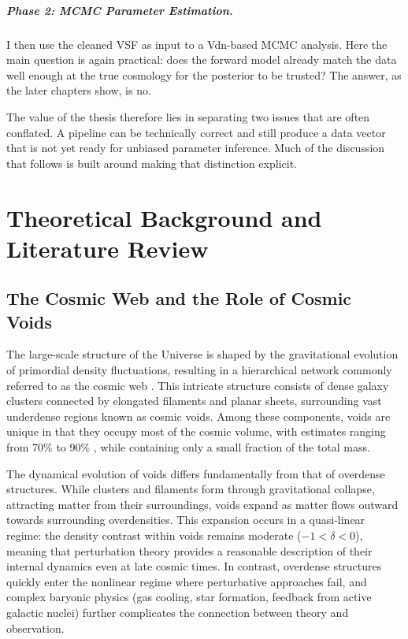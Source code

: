 \documentclass[12pt]{report}
\begin{document}
\paragraph{Phase 2: MCMC Parameter Estimation.} I then use the cleaned VSF as input to a Vdn-based MCMC analysis. Here the main question is again practical: does the forward model already match the data well enough at the true cosmology for the posterior to be trusted? The answer, as the later chapters show, is no.

The value of the thesis therefore lies in separating two issues that are often conflated. A pipeline can be technically correct and still produce a data vector that is not yet ready for unbiased parameter inference. Much of the discussion that follows is built around making that distinction explicit.


\chapter{Theoretical Background and Literature Review}

\section{The Cosmic Web and the Role of Cosmic Voids}

The large-scale structure of the Universe is shaped by the gravitational evolution of primordial density fluctuations, resulting in a hierarchical network commonly referred to as the cosmic web \citep{Bond1991,VanDeWeygaert2011}. This intricate structure consists of dense galaxy clusters connected by elongated filaments and planar sheets, surrounding vast underdense regions known as cosmic voids. Among these components, voids are unique in that they occupy most of the cosmic volume, with estimates ranging from 70\% to 90\% \citep{VanDeWeygaert2011}, while containing only a small fraction of the total mass.

The dynamical evolution of voids differs fundamentally from that of overdense structures. While clusters and filaments form through gravitational collapse, attracting matter from their surroundings, voids expand as matter flows outward towards surrounding overdensities. This expansion occurs in a quasi-linear regime: the density contrast within voids remains moderate ($-1 < \delta < 0$), meaning that perturbation theory provides a reasonable description of their internal dynamics even at late cosmic times. In contrast, overdense structures quickly enter the nonlinear regime where perturbative approaches fail, and complex baryonic physics (gas cooling, star formation, feedback from active galactic nuclei) further complicates the connection between theory and observation.
\end{document}

